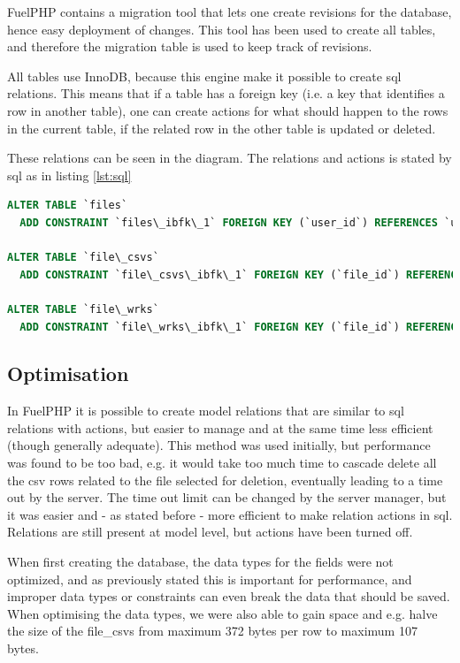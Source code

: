 FuelPHP contains a \textsf{migration} tool that lets one create revisions for the database, hence easy deployment of changes. This tool has been used to create all tables, and therefore the \textsf{migration} table is used to keep track of revisions.

All tables use \textsf{InnoDB}, because this engine make it possible to create sql relations. This means that if a table has a foreign key (i.e. a key that identifies a row in another table), one can create actions for what should happen to the rows in the current table, if the related row in the other table is \textsf{updated} or \textsf{deleted}.

These relations can be seen in the diagram. The relations and actions is stated by sql as in listing \ref{lst:sql}
\begin{lstlisting}[language=sql,caption={SQL realations and actions},label={lst:sql}]
ALTER TABLE `files`
  ADD CONSTRAINT `files\_ibfk\_1` FOREIGN KEY (`user_id`) REFERENCES `users` (`id`) ON DELETE NO ACTION ON UPDATE NO ACTION;

ALTER TABLE `file\_csvs`
  ADD CONSTRAINT `file\_csvs\_ibfk\_1` FOREIGN KEY (`file_id`) REFERENCES `files` (`id`) ON DELETE CASCADE ON UPDATE NO ACTION;

ALTER TABLE `file\_wrks`
  ADD CONSTRAINT `file\_wrks\_ibfk\_1` FOREIGN KEY (`file_id`) REFERENCES `files` (`id`) ON DELETE CASCADE ON UPDATE NO ACTION;
\end{lstlisting}

\subsection{Optimisation}
In FuelPHP it is possible to create model relations that are similar to sql relations with actions, but easier to manage and at the same time less efficient (though generally adequate). This method was used initially, but performance was found to be too bad, e.g. it would take too much time to cascade delete all the csv rows related to the file selected for deletion, eventually leading to a time out by the server. The time out limit can be changed by the server manager, but it was easier and - as stated before - more efficient to make relation actions in sql. Relations are still present at model level, but actions have been turned off.

When first creating the database, the data types for the fields were not optimized, and as previously stated this is important for performance, and improper data types or constraints can even break the data that should be saved. When optimising the data types, we were also able to gain space and e.g. halve the size of the \textsf{file\_csvs} from maximum 372 bytes per row to maximum 107 bytes.

